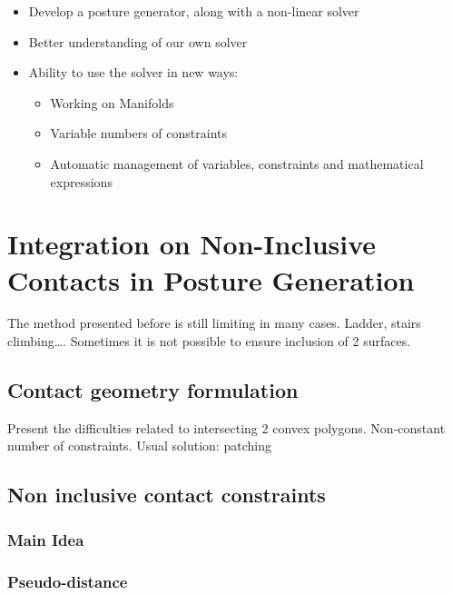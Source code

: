 \begin{itemize}
\begin{itemize}
\begin{itemize}
          \item Develop a posture generator, along with a non-linear solver
          \item Better understanding of our own solver
          \item Ability to use the solver in new ways:
          \begin{itemize}
            \item Working on Manifolds
            \item Variable numbers of constraints
            \item Automatic management of variables, constraints and mathematical expressions
          \end{itemize}
        \end{itemize}
    \end{itemize}
\end{itemize}



\section{Integration on Non-Inclusive Contacts in Posture Generation}


The method presented before is still limiting in many cases. Ladder, stairs climbing\dots.
Sometimes it is not possible to ensure inclusion of 2 surfaces.

\subsection{Contact geometry formulation}
\label{sec:background}
Present the difficulties related to intersecting 2 convex polygons. Non-constant number of constraints.
Usual solution: patching

\subsection{Non inclusive contact constraints}
\subsubsection{Main Idea}
\subsubsection{Pseudo-distance}
